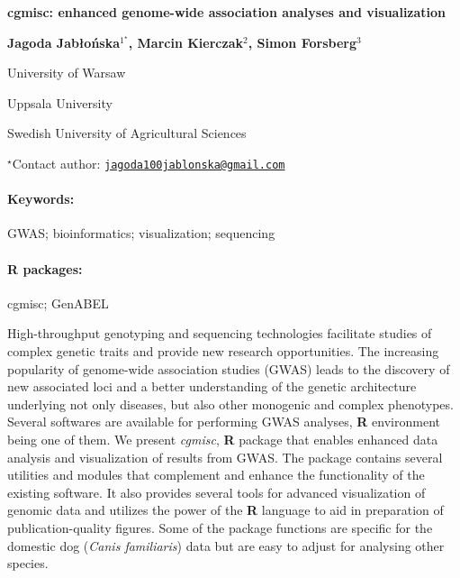\documentclass[11pt, a4paper]{article}
\renewcommand{\title}[1]{\begin{center}{\bf \LARGE #1}\end{center}}
\newcommand{\keywords}{\paragraph{Keywords:}}
\newcommand{\packages}{\paragraph{R packages:}}
\begin{document}
\pagestyle{empty}

\title{cgmisc: enhanced genome-wide association analyses and visualization}

\begin{center}
  {\bf Jagoda Jabłońska$^{1^\star}$, Marcin Kierczak$^{2}$, Simon Forsberg$^{3}$}
\end{center}

\vskip 0.3cm

\begin{affiliations}
\begin{enumerate}
\begin{minipage}{0.915\textwidth}
\centering
\item University of Warsaw \\[-2pt]
\item Uppsala University \\[-2pt]
\item Swedish University of Agricultural Sciences \\[-2pt]
\end{minipage}
\end{enumerate}
$^\star$Contact author: \href{mailto:jagoda100jablonska@gmail.com}{\nolinkurl{jagoda100jablonska@gmail.com}}\\
\end{affiliations}

\vskip 0.5cm

\begin{minipage}{0.915\textwidth}
\keywords GWAS; bioinformatics; visualization; sequencing
\packages cgmisc; GenABEL
\end{minipage}

\vskip 0.8cm

High-throughput genotyping and sequencing technologies facilitate
studies of complex genetic traits and provide new research
opportunities. The increasing popularity of genome-wide association
studies (GWAS) leads to the discovery of new associated loci and a
better understanding of the genetic architecture underlying not only
diseases, but also other monogenic and complex phenotypes. Several
softwares are available for performing GWAS analyses, \textbf{R}
environment being one of them. We present \emph{cgmisc}, \textbf{R}
package that enables enhanced data analysis and visualization of results
from GWAS. The package contains several utilities and modules that
complement and enhance the functionality of the existing software. It
also provides several tools for advanced visualization of genomic data
and utilizes the power of the \textbf{R} language to aid in preparation
of publication-quality figures. Some of the package functions are
specific for the domestic dog (\emph{Canis familiaris}) data but are
easy to adjust for analysing other species.
\end{document}
